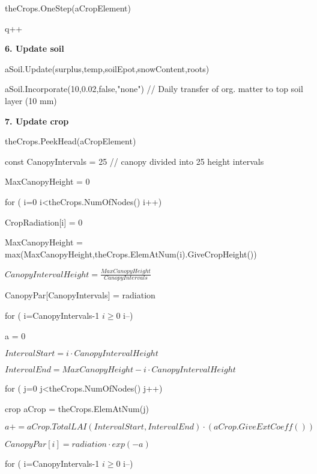 \documentclass[%
]{scrartcl}
\begin{document}
  \quad  theCrops.OneStep(aCropElement)

   \quad     q++
   

    \textbf{6. Update soil}

	 aSoil.Update(surplus,temp,soilEpot,snowContent,roots)
  	
aSoil.Incorporate(10,0.02,false,"none")   
   // Daily transfer of org. matter to top soil layer (10 mm)

   \textbf{7. Update crop}

\citep[3.3. Competition for light]{berntsen2004modelling}

   theCrops.PeekHead(aCropElement)
  
 const  CanopyIntervals = 25          // canopy divided into 25 height intervals
    
     
MaxCanopyHeight = 0

   for ( i=0 i<theCrops.NumOfNodes() i++)
   
  \quad    	CropRadiation[i] = 0

  \quad   	MaxCanopyHeight = max(MaxCanopyHeight,theCrops.ElemAtNum(i).GiveCropHeight())
   


     $CanopyIntervalHeight = \tfrac{MaxCanopyHeight}{CanopyIntervals}$

   CanopyPar[CanopyIntervals] = radiation

   for ( i=CanopyIntervals-1 $i\ge 0$  i--)
   
\quad         a = 0

   \quad     $ IntervalStart = i \cdot CanopyIntervalHeight$

 \quad      $  IntervalEnd = MaxCanopyHeight-i \cdot CanopyIntervalHeight$

 \quad      for ( j=0 j<theCrops.NumOfNodes() j++)
    

 \quad\quad         crop  aCrop = theCrops.ElemAtNum(j)
 
\quad \quad      	$a += aCrop.TotalLAI(IntervalStart,IntervalEnd) \cdot  (aCrop.GiveExtCoeff())
    $
     
  \quad    $ CanopyPar[i] = radiation \cdot exp(-a)$
   



   for ( i=CanopyIntervals-1 $i\ge 0$  i--)
    
\end{document}
